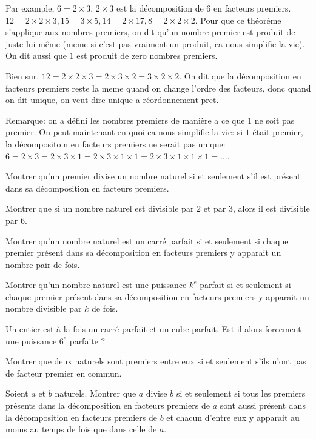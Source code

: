 \endgroup

Par example, \(6 = 2 \times 3\), \(2 \times 3\) est la décomposition de \(6\) en facteurs premiers. \(12 = 2 \times 2 \times 3, 15 = 3 \times 5, 14 = 2 \times 17, 8 = 2 \times 2 \times 2\).
Pour que ce théoréme s'applique aux nombres premiers, on dit qu'un nombre premier est produit de juste lui-même (meme si c'est pas vraiment un produit, ca nous simplifie la vie). On dit aussi que \(1\) est produit de zero nombres premiers.

Bien sur, \(12 = 2 \times 2 \times 3 = 2 \times 3 \times 2 = 3 \times 2 \times 2\). On dit que la décomposition en facteurs premiers reste la meme quand on change l'ordre des facteurs, donc quand on dit unique, on veut dire unique a réordonnement pret.

Remarque: on a défini les nombres premiers de manière a ce que \(1\) ne soit pas premier. On peut maintenant en quoi ca nous simplifie la vie: si \(1\) était premier, la décompositoin en facteurs premiers ne serait pas unique: \(6 = 2 \times 3 = 2 \times 3 \times 1 = 2 \times 3 \times 1 \times 1 = 2 \times 3 \times 1 \times 1 \times 1 = \ldots\).

\exo
Montrer qu'un premier divise un nombre naturel si et seulement s’il est présent dans sa décomposition en facteurs premiers.

\exo
Montrer que si un nombre naturel est divisible par \(2\) et par \(3\), alors il est divisible par \(6\).

\exo

Montrer qu’un nombre naturel est un carré parfait si et seulement si chaque premier présent dans sa décomposition en facteurs premiers y apparait un nombre pair de fois.

Montrer qu’un nombre naturel est une puissance \(k^{e}\) parfait si et seulement si chaque premier présent dans sa décomposition en facteurs premiers y apparait un nombre divisible par \(k\) de fois.

\exo
Un entier est à la fois un carré parfait et un cube parfait.
Est-il alors forcement une puissance \(6^{e}\) parfaite ?

\exo

Montrer que deux naturels sont premiers entre eux si et seulement s’ils n'ont pas de facteur premier en commun.


\exo
Soient \(a\) et \(b\) naturels.
Montrer que \(a\) divise \(b\) si et seulement si tous les premiers présents dans la décomposition en facteurs premiers de \(a\) sont aussi présent dans la décomposition en facteurs premiers de \(b\) et chacun d'entre eux y apparait au moins au temps de fois que dans celle de \(a\).


